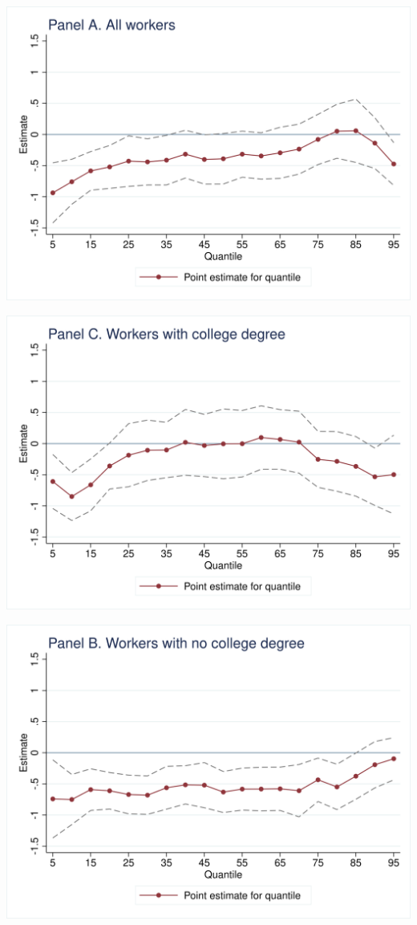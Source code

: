 \documentclass{article}
\begin{document}
\begin{center}\includegraphics[scale=0.15]{output/figure_quantile_all.png}\end{center}
\begin{center}\includegraphics[scale=0.15]{output/figure_quantile_high.png}\end{center}
\begin{center}\includegraphics[scale=0.15]{output/figure_quantile_low.png}\end{center}
\end{document}
